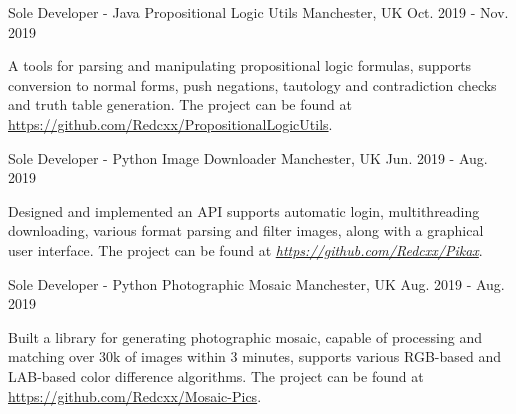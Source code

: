 \begin{cventries}
\begin{cventries}

  \cventry
    {Sole Developer - Java} %
    {Propositional Logic Utils} %
    {Manchester, UK} %
    {Oct. 2019 - Nov. 2019} %
    {
      \begin{cvitems} %
        \item {A tools for parsing and manipulating propositional logic formulas, supports conversion to normal forms, push negations, tautology and contradiction checks and truth table generation. The project can be found at \href{https://github.com/Redcxx/PropositionalLogicUtils}{https://github.com/Redcxx/PropositionalLogicUtils}.}
      \end{cvitems}
    }

  \cventry
    {Sole Developer - Python} %
    {Image Downloader} %
    {Manchester, UK} %
    {Jun. 2019 - Aug. 2019} %
    {
      \begin{cvitems} %
        \item {Designed and implemented an API supports automatic login, multithreading downloading, various format parsing and filter images, along with a graphical user interface. The project can be found at \href{https://github.com/Redcxx/Pikax}{\textit{https://github.com/Redcxx/Pikax}}.}
      \end{cvitems}
    }
  
    
  \cventry
  {Sole Developer - Python} %
  {Photographic Mosaic} %
  {Manchester, UK} %
  {Aug. 2019 - Aug. 2019} %
  {
    \begin{cvitems} %
      \item {Built a library for generating photographic mosaic, capable of processing and matching over 30k of images within 3 minutes, supports various RGB-based and LAB-based color difference algorithms. The project can be found at \href{https://github.com/Redcxx/Mosaic-Pics}{https://github.com/Redcxx/Mosaic-Pics}.}
    \end{cvitems}
  }


\end{cventries}
\end{cventries}
